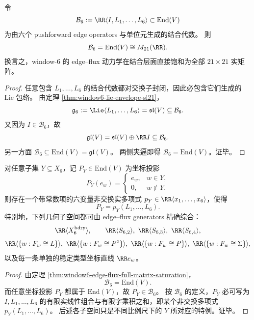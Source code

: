 \begin{theorem}\label{thm:window6-edge-flux-full-matrix-saturation}
令
\[
\mathcal B_6:=\RR\langle I,L_1,\dots,L_6\rangle\subset \mathrm{End}(V)
\]
为由六个 pushforward edge operators 与单位元生成的结合代数。
则
\[
\mathcal B_6=\mathrm{End}(V)\cong M_{21}(\RR).
\]
换言之，window-\(6\) 的 edge--flux 动力学在结合层面直接饱和为全部 \(21\times 21\) 实矩阵。
\end{theorem}
\begin{proof}
任意包含 \(L_1,\dots,L_6\) 的结合代数都对交换子封闭，因此必包含它们生成的 Lie 包络。
由定理 \ref{thm:window6-lie-envelope-sl21}，
\[
\mathfrak g_6:=\Lie\langle L_1,\dots,L_6\rangle=\mathfrak{sl}(V)\subseteq \mathcal B_6.
\]
又因为 \(I\in \mathcal B_6\)，故
\[
\mathfrak{gl}(V)=\mathfrak{sl}(V)\oplus \RR I\subseteq \mathcal B_6.
\]
另一方面 \(\mathcal B_6\subseteq \mathrm{End}(V)=\mathfrak{gl}(V)\)。
两侧夹逼即得 \(\mathcal B_6=\mathrm{End}(V)\)。证毕。
\end{proof}

\begin{corollary}[精确投影的非交换综合]\label{cor:window6-exact-projector-synthesis}
对任意子集 \(Y\subseteq X_6\)，记 \(P_Y\in \mathrm{End}(V)\) 为坐标投影
\[
P_Y(e_w)=
\begin{cases}
e_w,& w\in Y,\\
0,& w\notin Y.
\end{cases}
\]
则存在一个带常数项的六变量非交换实多项式 \(p_Y\in \RR\langle x_1,\dots,x_6\rangle\)，使得
\[
P_Y=p_Y(L_1,\dots,L_6).
\]
特别地，下列几何子空间都可由 edge--flux generators 精确综合：
\[
\RR\langle X_6^{\mathrm{bdry}}\rangle,\qquad
\RR\langle S_{6,2}\rangle,\ \RR\langle S_{6,3}\rangle,\ \RR\langle S_{6,4}\rangle,
\]
\[
\RR\langle \{w:F_w\cong L\}\rangle,\ \RR\langle \{w:F_w\cong P^\circ\}\rangle,\ 
\RR\langle \{w:F_w\cong P\}\rangle,\ \RR\langle \{w:F_w\cong \Sigma\}\rangle,
\]
以及每一条单独的稳定类型坐标直线 \(\RR e_w\)。
\end{corollary}
\begin{proof}
由定理 \ref{thm:window6-edge-flux-full-matrix-saturation}，
\[
\mathcal B_6=\mathrm{End}(V).
\]
而任意坐标投影 \(P_Y\) 都属于 \(\mathrm{End}(V)\)，故 \(P_Y\in \mathcal B_6\)。
按 \(\mathcal B_6\) 的定义，\(P_Y\) 必可写为 \(I,L_1,\dots,L_6\) 的有限实线性组合与有限字乘积之和，即某个非交换多项式 \(p_Y(L_1,\dots,L_6)\)。
后述各子空间只是不同比例尺下的 \(Y\) 所对应的特例。证毕。
\end{proof}

